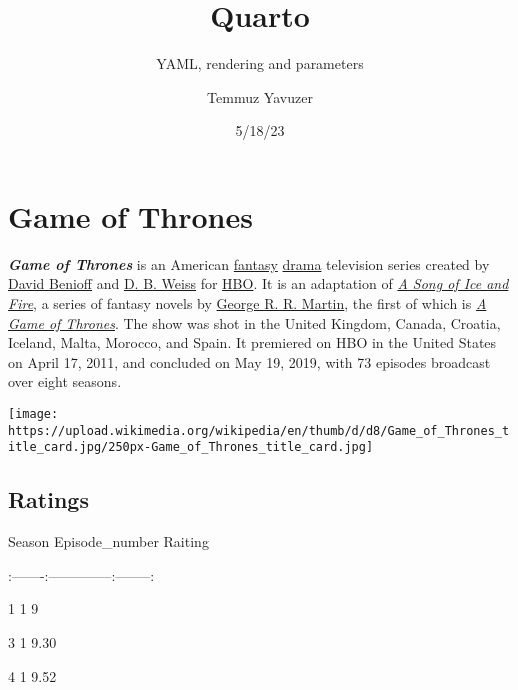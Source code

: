 \documentclass[
  letterpaper,
  DIV=11,
  numbers=noendperiod]{scrartcl}
\title{Quarto}
\subtitle{YAML, rendering and parameters}
\author{Temmuz Yavuzer}
\date{5/18/23}
\begin{document}
\maketitle
\ifdefined\Shaded\renewenvironment{Shaded}{\begin{tcolorbox}[breakable, borderline west={3pt}{0pt}{shadecolor}, frame hidden, boxrule=0pt, interior hidden, enhanced, sharp corners]}{\end{tcolorbox}}\fi

\hypertarget{game-of-thrones}{%
\section{Game of Thrones}\label{game-of-thrones}}

\textbf{\emph{Game of Thrones}} is an American
\href{https://en.wikipedia.org/wiki/Fantasy_television}{fantasy}
\href{https://en.wikipedia.org/wiki/Drama_(film_and_television)}{drama}
television series created by
\href{https://en.wikipedia.org/wiki/David_Benioff}{David Benioff} and
\href{https://en.wikipedia.org/wiki/D._B._Weiss}{D. B. Weiss} for
\href{https://en.wikipedia.org/wiki/HBO}{HBO}. It is an adaptation of
\href{https://en.wikipedia.org/wiki/A_Song_of_Ice_and_Fire}{\emph{A Song
of Ice and Fire}}, a series of fantasy novels by
\href{https://en.wikipedia.org/wiki/George_R._R._Martin}{George R. R.
Martin}, the first of which is
\href{https://en.wikipedia.org/wiki/A_Game_of_Thrones}{\emph{A Game of
Thrones}}. The show was shot in the United Kingdom, Canada, Croatia,
Iceland, Malta, Morocco, and Spain. It premiered on HBO in the United
States on April 17, 2011, and concluded on May 19, 2019, with 73
episodes broadcast over eight seasons.

\texttt{[image: https://upload.wikimedia.org/wikipedia/en/thumb/d/d8/Game\_of\_Thrones\_title\_card.jpg/250px-Game\_of\_Thrones\_title\_card.jpg]}

\hypertarget{ratings}{%
\subsection{Ratings}\label{ratings}}

Season \textbar{} Episode\_number \textbar{} Raiting \textbar{}

\textbar:-------\textbar:--------------:\textbar--------:\textbar{}

1 \textbar{} 1 \textbar{} 9 \textbar{}

3 \textbar{} 1 \textbar{} 9.30 \textbar{}

4 \textbar{} 1 \textbar{} 9.52 \textbar{}
\end{document}
